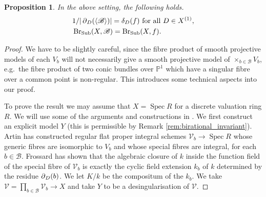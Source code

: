 \documentclass[a4paper,12pt,reqno]{amsart}
\numberwithin{equation}{section} \numberwithin{figure}{section}
\DeclareMathOperator{\Spec}{Spec}
\renewcommand\P{\mathbb{P}}
\newcommand{\Adele}{\mathbf{A}}
\newcommand{\br}{\mathscr{B}}
\renewcommand{\#}{\sharp}
\newtheorem{proposition}[lemma]{Proposition}
\theoremstyle{definition}
\newcommand{\dan}[1]{{\color{blue} \sf $\clubsuit\clubsuit\clubsuit$ Dan: [#1]}}
\numberwithin{lemma}{section}
\begin{document}
\begin{proposition} \label{prop:calculate_br_Sub}
	In the above setting, the following holds.
	\begin{align}
	&1/|\res_D(\langle\br\rangle)| = \delta_D(f) \text{ for all } D \in X^{(1)}, \label{eqn:res=delta} \\
	&\Sub(X,\br) = \Sub(X,f) \label{eqn:Sub=Sub}.
	\end{align}
\end{proposition}
\begin{proof}
We have to be slightly careful, since the fibre product of smooth projective models of each $V_b$ will not necessarily give a smooth projective model of $\times_{b \in \br} V_b$, e.g.~the fibre product of two conic bundles over $\P^1$ which have a singular fibre over a common point is non-regular. This introduces some technical aspects into our proof.

To prove the result we may assume that $X = \Spec R$ for a discrete valuation ring $R$. We will use some of the arguments and constructions in \cite[\S 2.4, \S2.6]{Lou18}. We first  construct an explicit model $Y$ (this is permissible by Remark \ref{rem:birational_invariant}). Artin \cite[Thm.~1.4]{Art82} has constructed	regular flat proper integral schemes $\mathcal{V}_b \to \Spec R$	whose generic fibres are isomorphic to $V_b$ and whose special fibres are integral, for each $b \in \br$. Frossard \cite[Prop.~2.3]{Fro97} has shown that the algebraic closure of $k$ inside the function field of the special fibre of $\mathcal{V}_b$ is exactly the cyclic field extension $k_b$ of $k$ determined by the residue $\operatorname{\partial}_D(b)$. We let $K/k$ be the compositum of the $k_b$.  We take $\mathcal{V} = \prod_{b \in \br} \mathcal{V}_{b} \to X$ and take $Y$ to be a desingularisation of $\mathcal{V}$.


\end{proof}
\end{document}
